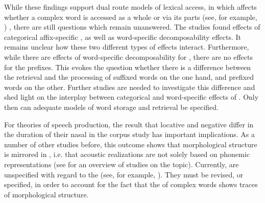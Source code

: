 While these findings support dual route models of lexical access, in which  affects whether a complex word is accessed as a whole or via its parts (see, for example, \citealt{Frauenfelder.1992,Schreuder.2015,deVaan.2011,Caselli.2016})
, there are still questions which remain unanswered. The studies found effects of categorical affix-specific , as well as word-specific decomposability effects. It remains unclear how these two different types of  effects interact. Furthermore, while there are effects of word-specific decomposability for , there are no effects for the prefixes. This evokes the question whether there is a difference between the retrieval and the processing of suffixed words on the one hand, and prefixed words on the other. Further studies are needed to investigate this difference and shed light on the interplay between categorical and word-specific effects of . Only then can adequate {models of word storage and retrieval} be specified. 



For theories of speech production, the result that locative  and negative  differ in the duration of their nasal in the corpus study has important implications. 
As a number of other studies before, this outcome shows that morphological structure is mirrored in , i.e. that  acoustic realizations are not solely based on phonemic representations (see  for an overview of studies on the topic). Currently,  are unspecified with regard to the  (see, for example, \citealt{Dell.1986,Johnson.1997b,Levelt.1999b,Bybee.2002,Pierrehumbert.2001,Pierrehumbert.2002}). They must be revised, or specified, in order to account for the fact that the  of complex words shows traces of morphological structure.

